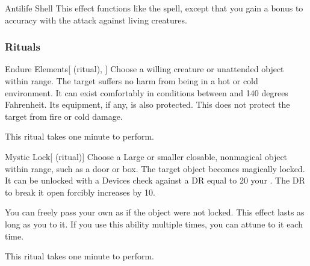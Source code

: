 \lowercase{\hypertarget{spell:Antilife Shell}{}}\label{spell:Antilife Shell}
\begin{ability}[\nth{5}]{\hypertarget{spell:Antilife Shell}{Antilife Shell}}
This effect functions like the  spell, except that you gain a  bonus to accuracy with the attack against living creatures.
\end{ability}
\vspace{0.25em}



\subsubsection{Rituals}


\lowercase{\hypertarget{spell:Endure Elements}{}}\label{spell:Endure Elements}
\begin{ability}[\nth{1}]{\hypertarget{spell:Endure Elements}{Endure Elements}}[ (ritual), ]
Choose a willing creature or unattended object within \rngclose range.
The target suffers no harm from being in a hot or cold environment.
It can exist comfortably in conditions between  and 140 degrees Fahrenheit.
Its equipment, if any, is also protected.
This does not protect the target from fire or cold damage.

This ritual takes one minute to perform.
\end{ability}
\vspace{0.25em}



\lowercase{\hypertarget{spell:Mystic Lock}{}}\label{spell:Mystic Lock}
\begin{ability}[\nth{2}]{\hypertarget{spell:Mystic Lock}{Mystic Lock}}[ (ritual)]
Choose a Large or smaller closable, nonmagical object within \rngclose range, such as a door or box.
The target object becomes magically locked.
It can be unlocked with a Devices check against a DR equal to 20 \add your .
The DR to break it open forcibly increases by 10.

You can freely pass your own  as if the object were not locked.
This effect lasts as long as you  to it.
If you use this ability multiple times, you can attune to it each time.

This ritual takes one minute to perform.
\end{ability}
\vspace{0.25em}



